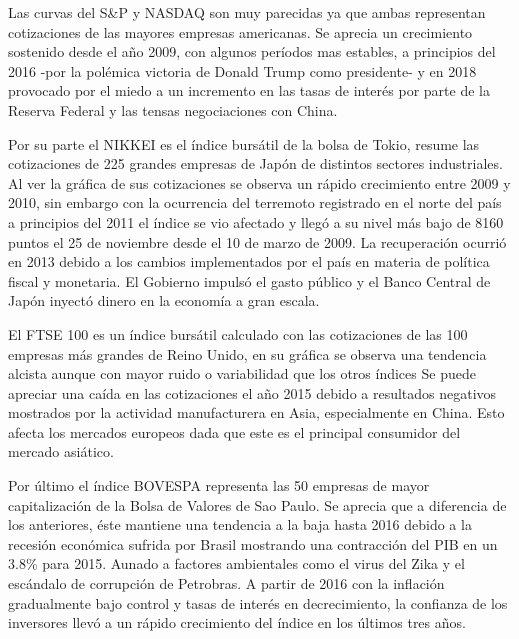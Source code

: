 \documentclass[a4paper,12pt]{Latex/Classes/PhDthesisPSnPDF}
\begin{document}
Las curvas del S\&P y NASDAQ son muy parecidas ya que ambas representan cotizaciones de las mayores empresas americanas. Se aprecia un crecimiento sostenido desde el año 2009, con algunos períodos mas estables, a principios del 2016 -por la polémica victoria de Donald Trump como presidente- y en 2018 provocado por el miedo a un incremento en las tasas de interés por parte de la Reserva Federal y las tensas negociaciones con China.

Por su parte el NIKKEI es el índice bursátil de la bolsa de Tokio, resume las cotizaciones de 225 grandes empresas de Japón de distintos sectores industriales. Al ver la gráfica de sus cotizaciones se observa un rápido crecimiento entre 2009 y 2010, sin embargo con la ocurrencia del terremoto registrado en el norte del país a principios del 2011 el índice se vio afectado y llegó a su nivel más bajo de 8160 puntos el 25 de noviembre desde el 10 de marzo de 2009. La recuperación ocurrió en 2013 debido a los cambios implementados por el país en materia de política fiscal y monetaria. El Gobierno impulsó el gasto público y el Banco Central de Japón inyectó dinero en la economía a gran escala.

El FTSE 100 es un índice bursátil calculado con las cotizaciones de las 100 empresas más grandes de Reino Unido, en su gráfica se observa una tendencia alcista aunque con mayor ruido o variabilidad que los otros índices Se puede apreciar una caída en las cotizaciones el año 2015 debido a resultados negativos mostrados por la actividad manufacturera en Asia, especialmente en China. Esto afecta los mercados europeos dada que este es el principal consumidor del mercado asiático.

Por último el índice BOVESPA representa las 50 empresas de mayor capitalización de la Bolsa de Valores de Sao Paulo. Se aprecia que a diferencia de los anteriores, éste mantiene una tendencia a la baja hasta 2016 debido a la recesión económica sufrida por Brasil mostrando una contracción del PIB en un 3.8\% para 2015. Aunado a factores ambientales como el virus del Zika y el escándalo de corrupción de Petrobras. A partir de 2016 con la inflación gradualmente bajo control y tasas de interés en decrecimiento, la confianza de los inversores llevó a un rápido crecimiento del índice en los últimos tres años.
\end{document}
